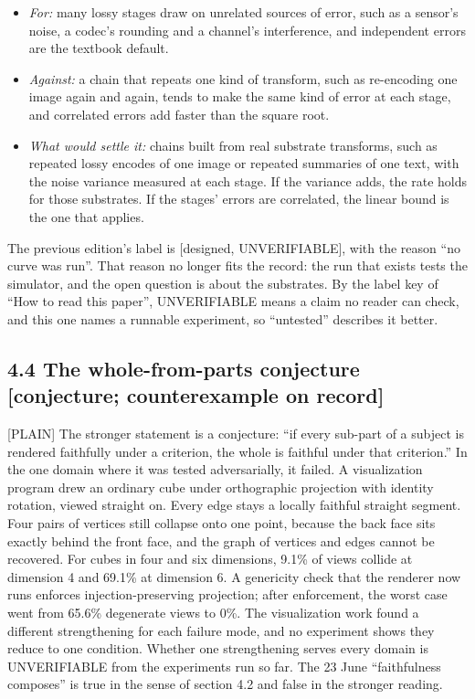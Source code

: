 \documentclass[11pt]{article}
\newcommand{\register}[1]{{\ttfamily\small #1}}
\begin{document}
\begin{itemize}
\item \emph{For:} many lossy stages draw on unrelated sources of error, such as a sensor's noise, a codec's rounding and a channel's interference, and independent errors are the textbook default.
\item \emph{Against:} a chain that repeats one kind of transform, such as re-encoding one image again and again, tends to make the same kind of error at each stage, and correlated errors add faster than the square root.
\item \emph{What would settle it:} chains built from real substrate transforms, such as repeated lossy encodes of one image or repeated summaries of one text, with the noise variance measured at each stage. If the variance adds, the rate holds for those substrates. If the stages' errors are correlated, the linear bound is the one that applies.
\end{itemize}
The previous edition's label is [designed, UNVERIFIABLE], with the reason ``no curve was run''. That reason no longer fits the record: the run that exists tests the simulator, and the open question is about the substrates. By the label key of ``How to read this paper'', UNVERIFIABLE means a claim no reader can check, and this one names a runnable experiment, so ``untested'' describes it better.

\subsection*{4.4 The whole-from-parts conjecture [conjecture; counterexample on record]}

\register{[PLAIN]} The stronger statement is a conjecture: ``if every sub-part of a subject is rendered faithfully under a criterion, the whole is faithful under that criterion.'' In the one domain where it was tested adversarially, it failed. A visualization program drew an ordinary cube under orthographic projection with identity rotation, viewed straight on. Every edge stays a locally faithful straight segment. Four pairs of vertices still collapse onto one point, because the back face sits exactly behind the front face, and the graph of vertices and edges cannot be recovered. For cubes in four and six dimensions, 9.1\% of views collide at dimension 4 and 69.1\% at dimension 6. A genericity check that the renderer now runs enforces injection-preserving projection; after enforcement, the worst case went from 65.6\% degenerate views to 0\%. The visualization work found a different strengthening for each failure mode, and no experiment shows they reduce to one condition. Whether one strengthening serves every domain is UNVERIFIABLE from the experiments run so far. The 23 June ``faithfulness composes'' is true in the sense of section 4.2 and false in the stronger reading.
\end{document}
